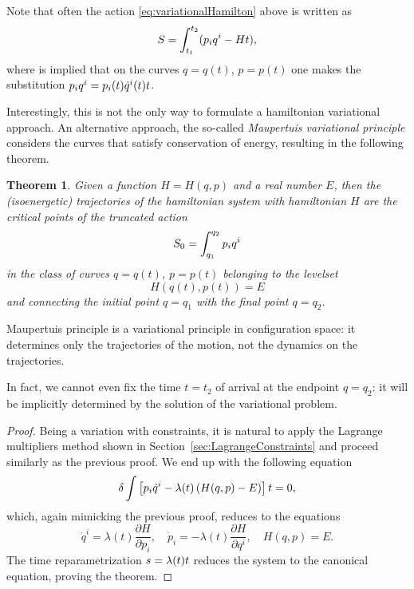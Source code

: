 \documentclass[english,fontsize=11pt,paper=a5,oneside]{scrbook}
\let\d\relax
\newcommand{\d}{\mathrm{d}}
\newtheorem{theorem}{Theorem}[chapter]
\theoremstyle{definition}
\newenvironment{remark}
  {\pushQED{\qed}\renewcommand{\qedsymbol}{$\lozenge$}\remarkx}
  {\popQED\endremarkx}
\begin{document}
Note that often the action \eqref{eq:variationalHamilton} above is written as
\begin{equation}
  S = \int_{t_1}^{t_2} (p_i \d q^i - H \d t),
\end{equation}
where is implied that on the curves $q=q(t)$, $p=p(t)$ one makes the substitution $p_i \d q^i = p_i(t) \dot q^i (t) \d t$.

Interestingly, this is not the only way to formulate a hamiltonian variational approach.
An alternative approach, the so-called \emph{Maupertuis variational principle} considers the curves that satisfy conservation of energy, resulting in the following theorem.

\begin{theorem}
  Given a function $H=H(q,p)$ and a real number $E$, then the (isoenergetic) \emph{trajectories} of the hamiltonian system with hamiltonian $H$ are the critical points of the truncated action
  \begin{equation}\label{eq:variationalMaupertuis}
    S_0 = \int_{q_1}^{q_2} p_i \d q^i
  \end{equation}
  in the class of curves $q=q(t)$, $p=p(t)$ belonging to the levelset
  \begin{equation}
    H(q(t),p(t)) = E
  \end{equation}
  and connecting the initial point $q=q_1$ with the final point $q=q_2$.
\end{theorem}

\begin{remark}
  Maupertuis principle is a variational principle in configuration space: it determines only the trajectories of the motion, not the dynamics on the trajectories.

  In fact, we cannot even fix the time $t=t_2$ of arrival at the endpoint $q=q_2$: it will be implicitly determined by the solution of the variational problem.
\end{remark}

\begin{proof}
  Being a variation with constraints, it is natural to apply the Lagrange multipliers method shown in Section~\ref{sec:LagrangeConstraints} and proceed similarly as the previous proof. We end up with the following equation
  \begin{equation}
    \delta \int \left[p_i \dot q^i - \lambda(t)\left(H(q,p) - E\right)\right]\d t = 0,
  \end{equation}
  which, again mimicking the previous proof, reduces to the equations
  \begin{equation}
    \dot q^i = \lambda(t) \frac{\partial H}{\partial p_i},
    \quad
    \dot p_i = -\lambda(t) \frac{\partial H}{\partial q^i},
    \quad H(q,p) = E.
  \end{equation}
  The time reparametrization $\d s = \lambda(t)\d t$ reduces the system to the canonical equation, proving the theorem.
\end{proof}
\end{document}

